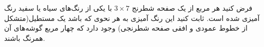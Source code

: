 \EXERCISE
فرض کنید هر مربع از یک صفحه شطرنج 
$3\times7$
با یکی از رنگ‌های سیاه یا سفید رنگ آمیزی شده است. ثابت کنید این رنگ آمیزی به هر نحوی که باشد یک مستطیل(متشکل از خطوط عمودی و افقی صفحه شطرنجی) وجود دارد که چهار مربع گوشه‌های آن همرنگ باشند.